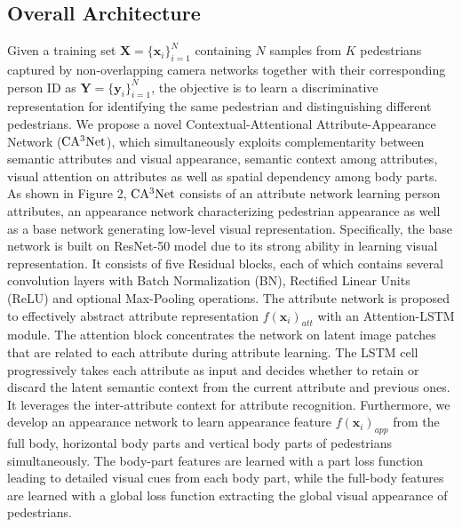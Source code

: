 \documentclass[sigconf]{acmart}
\begin{document}
\subsection{Overall Architecture}
Given a training set $\boldsymbol{X} = \{\boldsymbol{x}_i\}^{N}_{i=1}$ containing $N$ samples from $K$ pedestrians captured by non-overlapping camera networks together with their corresponding person ID as $\boldsymbol{Y}=\{\boldsymbol{y}_i\}_{i=1}^{N}$, the objective is to learn a discriminative representation for identifying the same pedestrian and distinguishing different pedestrians. We propose a novel Contextual-Attentional Attribute-Appearance Network ($\rm CA^3Net$), which simultaneously exploits complementarity between semantic attributes and visual appearance, semantic context among attributes, visual attention on attributes as well as spatial dependency among body parts. As shown in Figure 2, $\rm CA^3Net$ consists of an attribute network learning person attributes, an appearance network characterizing pedestrian appearance as well as a base network generating low-level visual representation. Specifically, the base network is built on ResNet-50 model \cite{13} due to its strong ability in learning visual representation. It consists of five Residual blocks, each of which contains several convolution layers with Batch Normalization (BN), Rectified Linear Units (ReLU) and optional Max-Pooling operations. The attribute network is proposed to effectively abstract attribute representation $f(\boldsymbol{x}_i)_{att}$ with an Attention-LSTM module. The attention block  concentrates the network on latent image patches that are related to each attribute during attribute learning. The LSTM cell progressively takes each attribute as input and decides whether to retain or discard the latent semantic context from the current attribute and previous ones. It leverages the inter-attribute context for attribute recognition. Furthermore, we develop an appearance network to learn appearance feature $f(\boldsymbol{x}_i)_{app}$ from the full body, horizontal body parts and vertical body parts of pedestrians simultaneously. The body-part features are learned with a part loss function leading to detailed visual cues from each body part, while the full-body features are learned with a global loss function extracting the global visual appearance of pedestrians.
\end{document}
